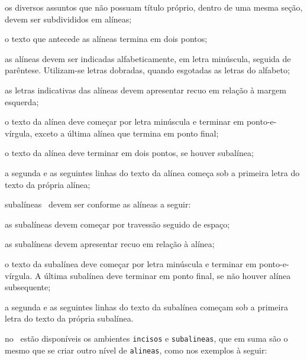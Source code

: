 \begin{alineas}

	\item os diversos assuntos que não possuam título próprio, dentro de uma mesma
	seção, devem ser subdivididos em alíneas;

	\item o texto que antecede as alíneas termina em dois pontos;
	\item as alíneas devem ser indicadas alfabeticamente, em letra minúscula,
	seguida de parêntese. Utilizam-se letras dobradas, quando esgotadas as
	letras do alfabeto;

	\item as letras indicativas das alíneas devem apresentar recuo em relação à
	margem esquerda;

	\item o texto da alínea deve começar por letra minúscula e terminar em
	ponto-e-vírgula, exceto a última alínea que termina em ponto final;

	\item o texto da alínea deve terminar em dois pontos, se houver subalínea;

	\item a segunda e as seguintes linhas do texto da alínea começa sob a
	primeira letra do texto da própria alínea;

	\item subalíneas~\cite[4.3]{NBR6024:2012} devem ser conforme as alíneas a
	seguir:

	\begin{alineas}
		\item as subalíneas devem começar por travessão seguido de espaço;

		\item as subalíneas devem apresentar recuo em relação à alínea;

		\item o texto da subalínea deve começar por letra minúscula e terminar em
		ponto-e-vírgula. A última subalínea deve terminar em ponto final, se não
		houver alínea subsequente;

		\item a segunda e as seguintes linhas do texto da subalínea começam sob a
		primeira letra do texto da própria subalínea.
	\end{alineas}

	\item no \abnTeX\ estão disponíveis os ambientes \texttt{incisos} e
	\texttt{subalineas}, que em suma são o mesmo que se criar outro nível de
	\texttt{alineas}, como nos exemplos à seguir:


\end{alineas}

